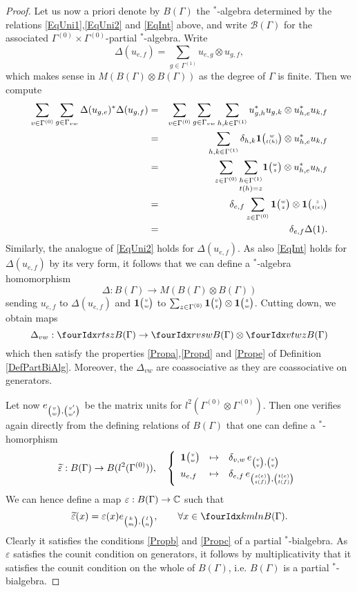 \begin{proof}
Let us now a priori denote by $B(\Gamma)$ the $^*$-algebra determined by the relations \eqref{EqUni1},\eqref{EqUni2} and \eqref{EqInt} above, and write $\mathscr{B}(\Gamma)$ for the associated $\Gamma^{(0)}\times \Gamma^{(0)}$-partial $^*$-algebra. Write \[\Delta(u_{e,f}) = \sum_{g\in \Gamma^{(1)}} u_{e,g}\otimes u_{g,f},\] which makes sense in $M(B(\Gamma)\otimes B(\Gamma))$ as the degree of $\Gamma$ is finite. Then we compute \begin{eqnarray*} \sum_{v\in \Gamma^{(0)}}\sum_{g\in \Gamma_{vw}}\Delta(u_{g,e})^*\Delta(u_{g,f}) &=& \sum_{v\in \Gamma^{(0)}}\sum_{g\in \Gamma_{vw}} \sum_{h,k\in \Gamma^{(1)}} u_{g,h}^*u_{g,k}\otimes u_{h,e}^*u_{k,f}\\ &=& \sum_{h,k\in \Gamma^{(1)}} \delta_{h,k} \mathbf{1}{\tiny {\begin{pmatrix} w\\t(h)\end{pmatrix}}}\otimes u_{h,e}^*u_{k,f}\\ &=&  \sum_{z\in \Gamma^{(0)}}\underset{t(h)=z}{\sum_{h\in \Gamma^{(1)}}} \mathbf{1}{\tiny {\begin{pmatrix} w\\z\end{pmatrix}}}\otimes u_{h,e}^*u_{h,f} \\ &=& \delta_{e,f} \sum_{z\in \Gamma^{(0)}} \mathbf{1}{\tiny {\begin{pmatrix} w\\z\end{pmatrix}}}\otimes \mathbf{1}{\tiny {\begin{pmatrix} z\\t(e)\end{pmatrix}}}\\ &=& \delta_{e,f} \Delta(1).\end{eqnarray*}  Similarly, the analogue of \eqref{EqUni2} holds for $\Delta(u_{e,f})$. As also \eqref{EqInt} holds for $\Delta(u_{e,f})$ by its very form, it follows that we can define a $^*$-algebra homomorphism \[\Delta:B(\Gamma)\rightarrow M(B(\Gamma)\otimes B(\Gamma))\] sending $u_{e,f}$ to $\Delta(u_{e,f})$ and $\mathbf{1}{\tiny {\begin{pmatrix} v\\w\end{pmatrix}}}$ to $\sum_{z\in \Gamma^{(0)}} \mathbf{1}{\tiny {\begin{pmatrix} v\\z\end{pmatrix}}}\otimes \mathbf{1}{\tiny {\begin{pmatrix} z\\w\end{pmatrix}}}$. Cutting down, we obtain maps \[\Delta_{vw}:\Gr{B(\Gamma)}{r}{s}{t}{z}\rightarrow \Gr{B(\Gamma)}{r}{s}{v}{w}\otimes \Gr{B(\Gamma)}{v}{w}{t}{z}\] which then satisfy the properties \ref{Propa},\ref{Propd} and \ref{Prope} of Definition \ref{DefPartBiAlg}. Moreover, the $\Delta_{vw}$ are coassociative as they are coassociative on generators.

Let now $e_{{\tiny \begin{pmatrix} v \\ w\end{pmatrix}},{\tiny \begin{pmatrix} v' \\ w'\end{pmatrix}}}$ be the matrix units for $l^2(\Gamma^{(0)}\otimes \Gamma^{(0)})$. Then one verifies again directly from the defining relations of $B(\Gamma)$ that one can define a $^*$-homorphism \[\widetilde{\varepsilon}: B(\Gamma)\rightarrow B(l^2(\Gamma^{(0)})),\quad \left\{\begin{array}{lll} \mathbf{1}{\tiny {\begin{pmatrix} v\\w\end{pmatrix}}}&\mapsto &\delta_{v,w}\, e_{{\tiny \begin{pmatrix} v \\ v\end{pmatrix}},{\tiny \begin{pmatrix} v \\ v\end{pmatrix}}}\\ u_{e,f}&\mapsto& \delta_{e,f}\, e_{{\tiny \begin{pmatrix} s(e) \\ s(f)\end{pmatrix}},{\tiny \begin{pmatrix} t(e) \\ t(f)\end{pmatrix}}}\end{array}\right.\] We can hence define a map $\varepsilon: B(\Gamma)\rightarrow \mathbb{C}$ such that \[\widetilde{\varepsilon}(x) = \varepsilon(x) e_{\Grru{k}{m},\Grru{l}{n}},\qquad  \forall x\in \Gr{B(\Gamma)}{k}{l}{m}{n}.\] Clearly it satisfies the conditions \ref{Propb} and \ref{Propc} of a partial $^*$-bialgebra. As $\varepsilon$ satisfies the counit condition on generators, it follows by multiplicativity that it satisfies the counit condition on the whole of $B(\Gamma)$, i.e. $B(\Gamma)$ is a partial $^*$-bialgebra.


\end{proof}
